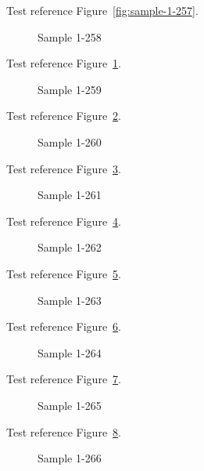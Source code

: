 Test reference Figure~\ref{fig:sample-1-257}.

\begin{figure}[tbhp]
\caption{Sample 1-258}
\label{fig:sample-1-258}
\end{figure}

Test reference Figure~\ref{fig:sample-1-258}.

\begin{figure}[tbhp]
\caption{Sample 1-259}
\label{fig:sample-1-259}
\end{figure}

Test reference Figure~\ref{fig:sample-1-259}.

\begin{figure}[tbhp]
\caption{Sample 1-260}
\label{fig:sample-1-260}
\end{figure}

Test reference Figure~\ref{fig:sample-1-260}.

\begin{figure}[tbhp]
\caption{Sample 1-261}
\label{fig:sample-1-261}
\end{figure}

Test reference Figure~\ref{fig:sample-1-261}.

\begin{figure}[tbhp]
\caption{Sample 1-262}
\label{fig:sample-1-262}
\end{figure}

Test reference Figure~\ref{fig:sample-1-262}.

\begin{figure}[tbhp]
\caption{Sample 1-263}
\label{fig:sample-1-263}
\end{figure}

Test reference Figure~\ref{fig:sample-1-263}.

\begin{figure}[tbhp]
\caption{Sample 1-264}
\label{fig:sample-1-264}
\end{figure}

Test reference Figure~\ref{fig:sample-1-264}.

\begin{figure}[tbhp]
\caption{Sample 1-265}
\label{fig:sample-1-265}
\end{figure}

Test reference Figure~\ref{fig:sample-1-265}.

\begin{figure}[tbhp]
\caption{Sample 1-266}
\label{fig:sample-1-266}
\end{figure}

